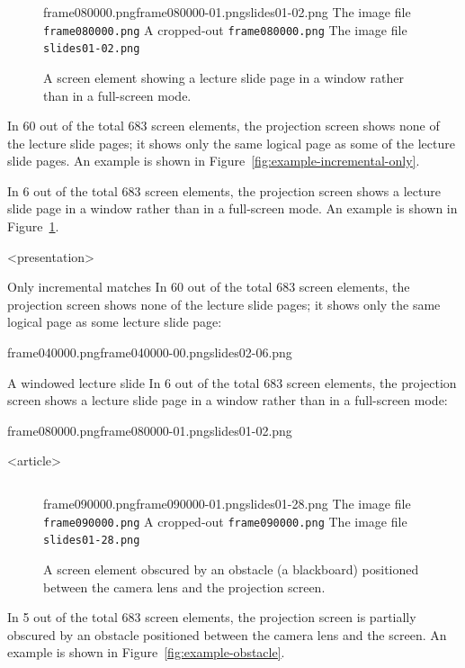 \begin{description}
\begin{figure}
    \kern\floatsep
    \inputminted{xml}{fig/examples/windowed/example.xml}\par
      {frame080000.png}{frame080000-01.png}{slides01-02.png}%
      {The image file \texttt{frame080000.png}}%
      {A cropped-out \texttt{frame080000.png}}%
      {The image file \texttt{slides01-02.png}}
    \caption{A screen element showing a lecture slide page in a window rather
      than in a full-screen mode.}
    \label{fig:example-windowed}
  \end{figure}
  \item[Only incremental matches] In 60 out of the total 683 screen elements,
    the projection screen shows none of the lecture slide pages; it shows only
    the same logical page as some of the lecture slide pages.
    An example is shown in Figure~\ref{fig:example-incremental-only}.
  \item[A windowed lecture slide] In 6 out of the total 683 screen elements,
    the projection screen shows a lecture slide page in a window rather than
    in a full-screen mode. An example is shown in
    Figure~\ref{fig:example-windowed}.

\mode
<presentation>

  \begin{frame}{Only incremental matches}
    In 60 out of the total 683 screen elements, the projection screen shows
    none of the lecture slide pages; it shows only the same logical page as
    some lecture slide page:

      {frame040000.png}{frame040000-00.png}{slides02-06.png}%
  \end{frame}
  \begin{frame}{A windowed lecture slide}
    In 6 out of the total 683 screen elements,
    the projection screen shows a lecture slide page in a window rather than
    in a full-screen mode:

      {frame080000.png}{frame080000-01.png}{slides01-02.png}%
  \end{frame}

\mode
<article>

  \begin{figure}[!t]
    \inputminted{xml}{fig/examples/obstacle/example.xml}\par
      {frame090000.png}{frame090000-01.png}{slides01-28.png}%
      {The image file \texttt{frame090000.png}}%
      {A cropped-out \texttt{frame090000.png}}%
      {The image file \texttt{slides01-28.png}}
    \caption{A screen element obscured by an obstacle (a blackboard) positioned
      between the camera lens and the projection screen.}
    \label{fig:example-obstacle}
    \label{fig:example-last}
  \end{figure}
  \item[Obscured projection screen] In 5 out of the total 683 screen elements,
    the projection screen is partially obscured by an obstacle positioned
    between the camera lens and the screen.
    An example is shown in Figure~\ref{fig:example-obstacle}.


\end{description}
